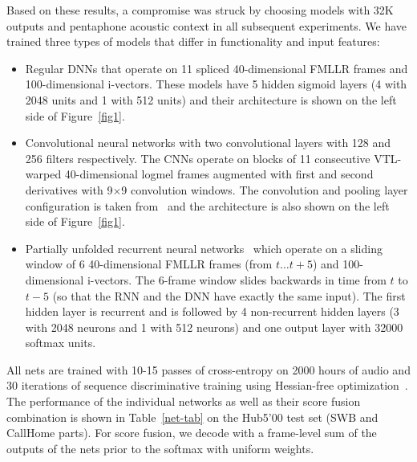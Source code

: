 \documentclass[a4paper]{article}
\begin{document}
Based on these results, a compromise was struck by choosing models
with 32K outputs and pentaphone acoustic context in all subsequent
experiments. We have trained three types of models that differ in
functionality and input features: 
\begin{itemize} 
\item Regular DNNs that operate on 11 spliced 40-dimensional FMLLR frames and 100-dimensional
i-vectors. These models have 5 hidden sigmoid layers (4 with 2048
units and 1 with 512 units) and their architecture is shown on the
left side of Figure~\ref{fig1}.  

\item Convolutional neural networks with two convolutional layers with
128 and 256 filters respectively. The CNNs operate on blocks of 11
consecutive VTL-warped 40-dimensional logmel frames augmented with
first and second derivatives with 9$\times$9 convolution windows. The convolution and pooling layer configuration is taken from~\cite{sainath13c} and the architecture is also shown on the left side of Figure~\ref{fig1}.

\item Partially unfolded recurrent neural networks~\cite{saon14} which operate on a sliding window of 6 40-dimensional FMLLR frames (from $t\ldots t+5$) and 100-dimensional i-vectors. The 6-frame window slides backwards in time from $t$ to $t-5$ (so that the RNN and the DNN have exactly the same input). The first hidden layer is recurrent and is followed by 4 non-recurrent hidden layers (3 with 2048 neurons and 1 with 512 neurons) and one output layer with 32000 softmax units.
\end{itemize}

All nets are trained with 10-15 passes of cross-entropy on 2000 hours
of audio and 30 iterations of sequence discriminative training using
Hessian-free optimization~\cite{bedk12}. The performance of the
individual networks as well as their score fusion combination is shown
in Table~\ref{net-tab} on the Hub5'00 test set (SWB and CallHome
parts). For score fusion, we decode with a frame-level sum of the
outputs of the nets prior to the softmax with uniform weights.
\end{document}
